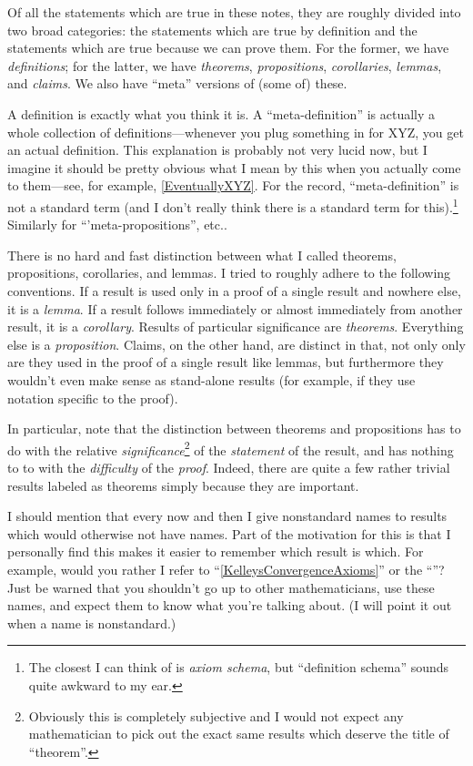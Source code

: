 Of all the statements which are true in these notes, they are roughly divided into two broad categories:  the statements which are true by definition and the statements which are true because we can prove them.  For the former, we have \emph{definitions}; for the latter, we have \emph{theorems}, \emph{propositions}, \emph{corollaries}, \emph{lemmas}, and \emph{claims}.  We also have ``meta'' versions of (some of) these.

A definition is exactly what you think it is.  A ``meta-definition'' is actually a whole collection of definitions---whenever you plug something in for XYZ, you get an actual definition.  This explanation is probably not very lucid now, but I imagine it should be pretty obvious what I mean by this when you actually come to them---see, for example, \cref{EventuallyXYZ}.  For the record, ``meta-definition'' is not a standard term (and I don't really think there is a standard term for this).\footnote{The closest I can think of is \emph{axiom schema}, but ``definition schema'' sounds quite awkward to my ear.}  Similarly for ``'meta-propositions'', etc..

There is no hard and fast distinction between what I called theorems, propositions, corollaries, and lemmas.  I tried to roughly adhere to the following conventions.  If a result is used only in a proof of a single result and nowhere else, it is a \emph{lemma}.  If a result follows immediately or almost immediately from another result, it is a \emph{corollary}.  Results of particular significance are \emph{theorems}.  Everything else is a \emph{proposition}.  Claims, on the other hand, are distinct in that, not only only are they used in the proof of a single result like lemmas, but furthermore they wouldn't even make sense as stand-alone results (for example, if they use notation specific to the proof).

In particular, note that the distinction between theorems and propositions has to do with the relative \emph{significance}\footnote{Obviously this is completely subjective and I would not expect any mathematician to pick out the exact same results which deserve the title of ``theorem''.} of the \emph{statement} of the result, and has nothing to to with the \emph{difficulty} of the \emph{proof}.  Indeed, there are quite a few rather trivial results labeled as theorems simply because they are important.

I should mention that every now and then I give nonstandard names to results which would otherwise not have names.  Part of the motivation for this is that I personally find this makes it easier to remember which result is which.  For example, would you rather I refer to ``\cref{KelleysConvergenceAxioms}'' or the ``''?  Just be warned that you shouldn't go up to other mathematicians, use these names, and expect them to know what you're talking about.  (I will point it out when a name is nonstandard.)

